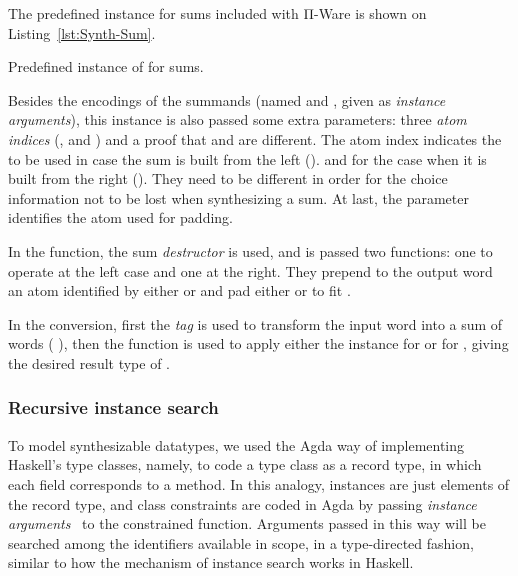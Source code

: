             The predefined instance for sums included with Π-Ware is shown on Listing~\ref{lst:Synth-Sum}.

            \begin{listing}[ht]
                \caption{Predefined instance of  for sums.\label{lst:Synth-Sum}}
            \end{listing}

            Besides the encodings of the summands (named  and ,
            given as \emph{instance arguments}), this instance is also passed some extra parameters:
            three \emph{atom indices} (,  and ) and a proof that  and  are different.
            The atom index  indicates the  to be used in case the sum is built from the left ().
            and  for the case when it is built from the right ().
            They need to be different in order for the choice information not to be lost when synthesizing a sum.
            At last, the  parameter identifies the atom used for padding.

            In the  function, the \AF{[\_,\_]} sum \emph{destructor} is used,
            and is passed two functions: one to operate at the left case and one at the right.
            They prepend to the output word an atom identified by either  or  and pad
            either  or  to fit   .

            In the  conversion, first the \emph{tag} is used to transform the input word into
            a sum of words (    ),
            then the  function is used to apply either the  instance for  or for ,
            giving the desired result type of   .

            \subsubsection{Recursive instance search}
            To model synthesizable datatypes, we used the Agda way of implementing Haskell's type classes,
            namely, to code a type class as a record type, in which each field corresponds to a method.
            In this analogy, instances are just elements of the record type, and class constraints are
            coded in Agda by passing \emph{instance arguments}~\cite{typeclasses-agda} to the constrained function.
            Arguments passed in this way will be searched among the identifiers available in scope,
            in a type-directed fashion, similar to how the mechanism of instance search works in Haskell.

